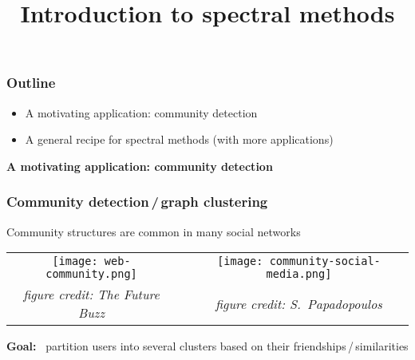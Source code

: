 \documentclass[compress,
mathserif,wide,%
]{beamer}
\title %
[Intro to spectral methods]{Introduction to spectral methods}
\begin{document}
\begin{frame}[plain]
  \titlepage

\end{frame}


\begin{frame}
\frametitle{Outline}

\begin{itemize}
  \itemsep1em
  \item A motivating application: community detection
  \item A general recipe for spectral methods (with more applications)
\end{itemize}

\end{frame}




\begin{frame}[plain]

\vfill
\begin{center}
  {\Large\bf A motivating application: community detection}
\end{center}
\vfill

\end{frame}



\begin{frame}
\frametitle{Community detection\,/\,graph clustering}

\bigskip


Community structures are common in many social networks

\vspace{-0.5em}
\begin{center}

\begin{tabular}{ccc}
 \texttt{[image: web-community.png]}  &\quad & 
 \texttt{[image: community-social-media.png]}
 \vspace{0.5em}
\tabularnewline
{\footnotesize\em figure credit: The Future Buzz} & & {\footnotesize\em figure credit: S.~Papadopoulos} \tabularnewline
\end{tabular}

\end{center}

\vfill

{

\begin{varblock}[\textwidth]{}
\begin{center}
	{\bf Goal:} ~partition users into several clusters based on their friendships\,/\,similarities
\end{center}
\end{varblock}
}


\end{frame}
\end{document}

